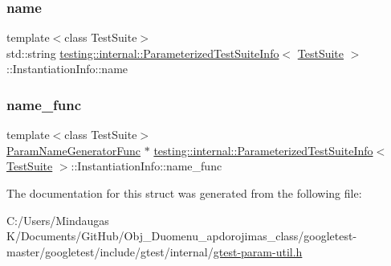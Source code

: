 \subsubsection{\texorpdfstring{name}{name}}
{\footnotesize\ttfamily template$<$class Test\+Suite$>$ \\
std\+::string \mbox{\hyperlink{classtesting_1_1internal_1_1_parameterized_test_suite_info}{testing\+::internal\+::\+Parameterized\+Test\+Suite\+Info}}$<$ \mbox{\hyperlink{classtesting_1_1_test_suite}{Test\+Suite}} $>$\+::Instantiation\+Info\+::name}

\mbox{\label{structtesting_1_1internal_1_1_parameterized_test_suite_info_1_1_instantiation_info_a1217ae4145895436933b539716315203}} 
\subsubsection{\texorpdfstring{name\_func}{name\_func}}
{\footnotesize\ttfamily template$<$class Test\+Suite$>$ \\
\mbox{\hyperlink{classtesting_1_1internal_1_1_parameterized_test_suite_info_a3b4f232b7d6d3df941bb8e81b6b534a4}{Param\+Name\+Generator\+Func}} $\ast$ \mbox{\hyperlink{classtesting_1_1internal_1_1_parameterized_test_suite_info}{testing\+::internal\+::\+Parameterized\+Test\+Suite\+Info}}$<$ \mbox{\hyperlink{classtesting_1_1_test_suite}{Test\+Suite}} $>$\+::Instantiation\+Info\+::name\+\_\+func}



The documentation for this struct was generated from the following file\+:\begin{DoxyCompactItemize}
\item 
C\+:/\+Users/\+Mindaugas K/\+Documents/\+Git\+Hub/\+Obj\+\_\+\+Duomenu\+\_\+apdorojimas\+\_\+class/googletest-\/master/googletest/include/gtest/internal/\mbox{\hyperlink{googletest-master_2googletest_2include_2gtest_2internal_2gtest-param-util_8h}{gtest-\/param-\/util.\+h}}\end{DoxyCompactItemize}

